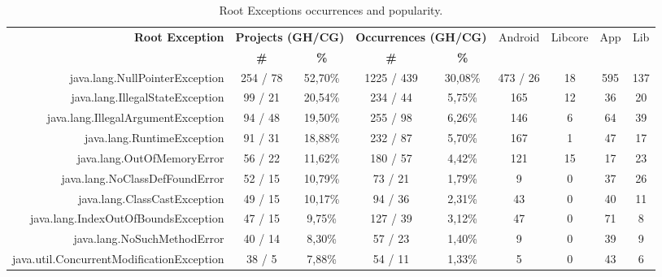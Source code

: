 \documentclass[conference]{IEEEtran}
\begin{document}
\begin{table}
  \centering
  \begin{tabular}{rcccccccc}
    \hline
    \bfseries{Root Exception} &  \multicolumn{2}{c}{\bfseries{Projects (GH/CG)}} &  \multicolumn{2}{c}{\bfseries{Occurrences (GH/CG)}} & \textsf{Android} & \textsf{Libcore} & \textsf{App} & \textsf{Lib} \\
    & \bfseries{\#} &  \bfseries{\%} & \bfseries{\# } & \bfseries{\% } &&&&\\
    \hline
java.lang.NullPointerException            & 254 /  78  & 52,70\%  & 1225 / 439  & 30,08\% & 473 /  26  & 18 & 595 & 137 \\  %
java.lang.IllegalStateException          & 99 / 21  & 20,54\%  & 234 / 44  & 5,75\%  & 165 & 12 & 36  & 20  \\
java.lang.IllegalArgumentException          & 94 / 48  & 19,50\% & 255 / 98  & 6,26\% & 146 & 6  & 64  & 39   \\
java.lang.RuntimeException                & 91 / 31 & 18,88\% & 232 / 87  & 5,70\%  & 167 & 1  & 47  & 17   \\
java.lang.OutOfMemoryError                 & 56  / 22  & 11,62\% & 180 / 57 & 4,42\% & 121 & 15 & 17  & 23   \\
java.lang.NoClassDefFoundError           & 52  / 15 & 10,79\%  & 73 / 21   & 1,79\%  & 9   & 0  & 37  & 26   \\
java.lang.ClassCastException             & 49  / 15 & 10,17\%  & 94 / 36   & 2,31\%  & 43  & 0  & 40  & 11   \\
java.lang.IndexOutOfBoundsException       & 47  / 15 & 9,75\%   & 127 / 39  & 3,12\% & 47  & 0  & 71  & 8    \\
java.lang.NoSuchMethodError               & 40 / 14  & 8,30\%  & 57 / 23  & 1,40\%  & 9   & 0  & 39  & 9   \\
java.util.ConcurrentModificationException & 38 / 5 & 7,88\% & 54 / 11  & 1,33\%   & 5   & 0  & 43  & 6   \\

    \hline
  \end{tabular}
\caption{Root Exceptions occurrences and popularity.}
\label{tab:toptenandroid}
\end{table}

 
\end{document}
